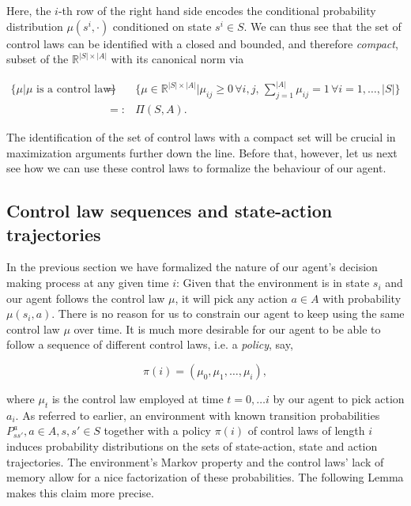 \documentclass[11pt]{article} %
\begin{document}
Here, the $i$-th row of the right hand side encodes the conditional probability distribution $\mu(s^i, \cdot)$ conditioned on state $s^i \in S$. We can thus see that the set of control laws can be identified with a closed and bounded, and therefore \textit{compact}, subset of the $\mathbb{R}^{|S| \times |A|}$ with its canonical norm via

\begin{equation}\label{defPolicySpace}
	\begin{array}{rcl}
		\Big\{ \mu | \mu \text{ is a control law} \Big\} 	& = & \Big\{ \mu \in \mathbb{R}^{|S| \times |A|} \Big| \mu_{ij} \ge 0 \, \forall i,j, \, \sum\limits_{j=1}^{|A|} \mu_{ij} = 1 \, \forall i=1,\dots,|S| \Big\} \\
											& =: & \Pi(S,A).
	\end{array}
\end{equation}

The identification of the set of control laws with a compact set will be crucial in maximization arguments further down the line. Before that, however, let us next see how we can use these control laws to formalize the behaviour of our agent.

\subsection{Control law sequences and state-action trajectories}\label{controlLawTrajs}

In the previous section we have formalized the nature of our agent's decision making process at any given time $i$: Given that the environment is in state $s_i$ and our agent follows the control law $\mu$, it will pick any action $a \in A$ with probability $\mu(s_i,a)$. There is no reason for us to constrain our agent to keep using the same control law $\mu$ over time. It is much more desirable for our agent to be able to follow a sequence of different control laws, i.e. a \textit{policy}, say,

\begin{equation}\label{controlLawSeqence}
	\pi(i) = (\mu_0, \mu_1, \dots, \mu_i),
\end{equation}

where $\mu_t$ is the control law employed at time $t = 0,\dots i$ by our agent to pick action $a_i$. As referred to earlier, an environment with known transition probabilities $P^a_{ss'}, a \in A, s,s' \in S$ together with a policy $\pi(i)$ of control laws of length $i$ induces probability distributions on the sets of state-action, state and action trajectories. The environment's Markov property and the control laws' lack of memory allow for a nice factorization of these probabilities. The following Lemma makes this claim more precise.
\end{document}
